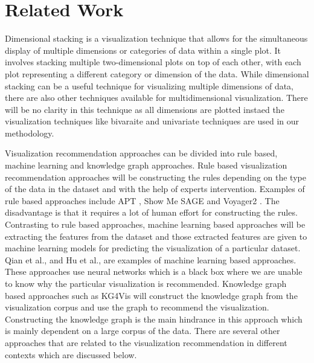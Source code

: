 \chapter{Related Work}
Dimensional stacking is a visualization technique that allows for the simultaneous display of multiple dimensions or categories of data within a single plot. It involves stacking multiple two-dimensional plots on top of each other, with each plot representing a different category or dimension of the data. While dimensional stacking can be a useful technique for visualizing multiple dimensions of data, there are also other techniques available for multidimensional visualization. There will be no clarity in this technique as all dimensions are plotted instaed the visualization techniques like bivaraite and univariate techniques are used in our methodology.

Visualization recommendation approaches can be divided into rule based, machine learning and  knowledge graph approaches. Rule based visualization recommendation approaches will be constructing the rules depending on the type of the data in the dataset and with the help of experts intervention. Examples of rule based approaches include APT \cite{ref_auto}, Show Me\cite{ref_showme} SAGE \cite{ref_int} and Voyager2 \cite{ref_voyager}. The disadvantage is that it requires a lot of human effort for constructing the rules.  Contrasting to rule based approaches, machine learning based approaches will be extracting the features from the dataset and those extracted features are given to machine learning models for predicting the visualization of a particular dataset.  Qian et al., \cite{mlbased} and Hu et al., \cite{vizml} are examples of machine learning based approaches. These approaches use neural networks which is a black box where we are unable to know why the particular visualization is recommended. Knowledge graph based approaches such as KG4Vis \cite{kg4vis} will construct the knowledge graph from the visualization corpus and use the graph to recommend the visualization. Constructing the knowledge graph is the main hindrance in this approach which is mainly dependent on a large corpus of the data. There are several other approaches that are related to the visualization recommendation in different contexts which are discussed below.

